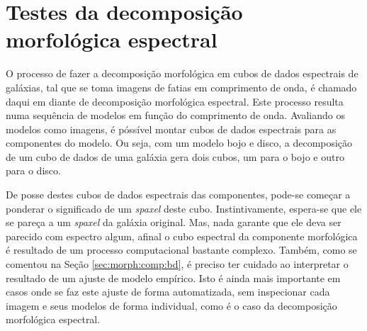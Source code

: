 


\chapter{Testes da decomposição morfológica espectral}

O processo de fazer a decomposição morfológica em cubos de dados espectrais de
galáxias, tal que se toma imagens de fatias em comprimento de onda, é chamado
daqui em diante de decomposição morfológica espectral. Este processo resulta
numa sequência de modelos em função do comprimento de onda. Avaliando os modelos
como imagens, é póssível montar cubos de dados espectrais para as componentes do
modelo. Ou seja, com um modelo bojo e disco, a decomposição de um cubo de dados
de uma galáxia gera dois cubos, um para o bojo e outro para o disco.

De posse destes cubos de dados espectrais das componentes, pode-se começar a
ponderar o significado de um {\em spaxel} deste cubo. Instintivamente, espera-se
que ele se pareça a um {\em spaxel} da galáxia original. Mas, nada garante que
ele deva ser parecido com espectro algum, afinal o cubo espectral da componente
morfológica é resultado de um processo computacional bastante complexo.
Também, como se comentou na Seção \ref{sec:morph:comp:bd}, é preciso ter cuidado
ao interpretar o resultado de um ajuste de modelo empírico.
Isto é ainda mais importante em casos onde se faz este ajuste de forma
automatizada, sem inspecionar cada imagem e seus modelos de forma individual,
como é o caso da decomposição morfológica espectral.

